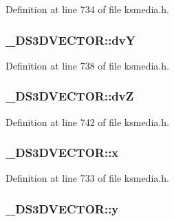 Definition at line 734 of file ksmedia.\+h.

\subsubsection[{\texorpdfstring{dvY}{dvY}}]{ \+\_\+\+D\+S3\+D\+V\+E\+C\+T\+O\+R\+::dvY}\hypertarget{struct___d_s3_d_v_e_c_t_o_r_a87d9c717a4e8f4e111ca938efd94f573}{}\label{struct___d_s3_d_v_e_c_t_o_r_a87d9c717a4e8f4e111ca938efd94f573}


Definition at line 738 of file ksmedia.\+h.

\subsubsection[{\texorpdfstring{dvZ}{dvZ}}]{ \+\_\+\+D\+S3\+D\+V\+E\+C\+T\+O\+R\+::dvZ}\hypertarget{struct___d_s3_d_v_e_c_t_o_r_a4d5087d5cb445f42ca5cffd5da708afa}{}\label{struct___d_s3_d_v_e_c_t_o_r_a4d5087d5cb445f42ca5cffd5da708afa}


Definition at line 742 of file ksmedia.\+h.

\subsubsection[{\texorpdfstring{x}{x}}]{ \+\_\+\+D\+S3\+D\+V\+E\+C\+T\+O\+R\+::x}\hypertarget{struct___d_s3_d_v_e_c_t_o_r_a800656a73070d139ef42813d76cd47e5}{}\label{struct___d_s3_d_v_e_c_t_o_r_a800656a73070d139ef42813d76cd47e5}


Definition at line 733 of file ksmedia.\+h.

\subsubsection[{\texorpdfstring{y}{y}}]{ \+\_\+\+D\+S3\+D\+V\+E\+C\+T\+O\+R\+::y}\hypertarget{struct___d_s3_d_v_e_c_t_o_r_a56fe31ae21c62c2cb515c9a56993503d}{}\label{struct___d_s3_d_v_e_c_t_o_r_a56fe31ae21c62c2cb515c9a56993503d}


